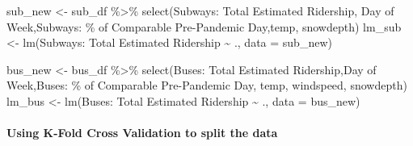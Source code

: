 \documentclass[
  letterpaper,
  DIV=11,
  numbers=noendperiod]{scrartcl}
\let\oldparagraph\paragraph
\renewcommand{\paragraph}[1]{\oldparagraph{#1}\mbox{}}
\newenvironment{Shaded}{\begin{snugshade}}{\end{snugshade}}
\newcommand{\AttributeTok}[1]{\textcolor[rgb]{0.40,0.45,0.13}{#1}}
\newcommand{\FunctionTok}[1]{\textcolor[rgb]{0.28,0.35,0.67}{#1}}
\newcommand{\NormalTok}[1]{\textcolor[rgb]{0.00,0.23,0.31}{#1}}
\newcommand{\OtherTok}[1]{\textcolor[rgb]{0.00,0.23,0.31}{#1}}
\newcommand{\SpecialCharTok}[1]{\textcolor[rgb]{0.37,0.37,0.37}{#1}}
\newcommand{\StringTok}[1]{\textcolor[rgb]{0.13,0.47,0.30}{#1}}
\begin{document}
\begin{Shaded}
\begin{Highlighting}[]
\NormalTok{sub\_new }\OtherTok{\textless{}{-}}\NormalTok{ sub\_df }\SpecialCharTok{\%\textgreater{}\%}
  \FunctionTok{select}\NormalTok{(}\StringTok{\textasciigrave{}}\AttributeTok{Subways: Total Estimated Ridership}\StringTok{\textasciigrave{}}\NormalTok{, }\StringTok{\textasciigrave{}}\AttributeTok{Day of Week}\StringTok{\textasciigrave{}}\NormalTok{,}\StringTok{\textasciigrave{}}\AttributeTok{Subways: \% of Comparable Pre{-}Pandemic Day}\StringTok{\textasciigrave{}}\NormalTok{,temp, snowdepth)}
\NormalTok{lm\_sub }\OtherTok{\textless{}{-}} \FunctionTok{lm}\NormalTok{(}\StringTok{\textasciigrave{}}\AttributeTok{Subways: Total Estimated Ridership}\StringTok{\textasciigrave{}} \SpecialCharTok{\textasciitilde{}}\NormalTok{ ., }\AttributeTok{data =}\NormalTok{ sub\_new)}

\NormalTok{bus\_new }\OtherTok{\textless{}{-}}\NormalTok{ bus\_df }\SpecialCharTok{\%\textgreater{}\%}
  \FunctionTok{select}\NormalTok{(}\StringTok{\textasciigrave{}}\AttributeTok{Buses: Total Estimated Ridership}\StringTok{\textasciigrave{}}\NormalTok{,}\StringTok{\textasciigrave{}}\AttributeTok{Day of Week}\StringTok{\textasciigrave{}}\NormalTok{,}\StringTok{\textasciigrave{}}\AttributeTok{Buses: \% of Comparable Pre{-}Pandemic Day}\StringTok{\textasciigrave{}}\NormalTok{, temp, windspeed, snowdepth)}
\NormalTok{lm\_bus }\OtherTok{\textless{}{-}} \FunctionTok{lm}\NormalTok{(}\StringTok{\textasciigrave{}}\AttributeTok{Buses: Total Estimated Ridership}\StringTok{\textasciigrave{}} \SpecialCharTok{\textasciitilde{}}\NormalTok{ ., }\AttributeTok{data =}\NormalTok{ bus\_new)}
\end{Highlighting}
\end{Shaded}

\hypertarget{using-k-fold-cross-validation-to-split-the-data}{%
\paragraph{Using K-Fold Cross Validation to split the
data}\label{using-k-fold-cross-validation-to-split-the-data}}
\end{document}
